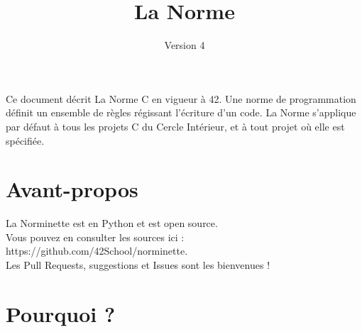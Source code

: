 \documentclass{42-fr}
\begin{document}
\title{La Norme}
\subtitle{Version 4}

\summary
{
    Ce document décrit La Norme C en vigueur à 42. Une norme de programmation 
    définit un ensemble de règles régissant l’écriture d’un code. 
    La Norme s'applique par défaut à tous les projets C du
    Cercle Intérieur, et à tout projet où elle est spécifiée.
    
}

\maketitle

\tableofcontents



\chapter{Avant-propos}

    La Norminette est en Python et est open source.\\
    Vous pouvez en consulter les sources ici : https://github.com/42School/norminette.\\
    Les Pull Requests, suggestions et Issues sont les bienvenues !
%
%

    \chapter{Pourquoi ?}
\end{document}
